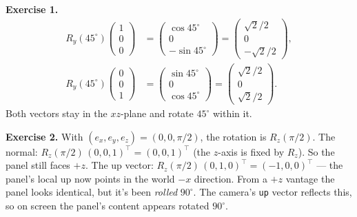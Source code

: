 \documentclass{article}
\begin{document}
\textbf{Exercise 1.}
\begin{align*}
R_y(45^\circ)\begin{pmatrix}1\\0\\0\end{pmatrix} &= \begin{pmatrix}\cos 45^\circ\\ 0\\ -\sin 45^\circ\end{pmatrix} = \begin{pmatrix}\sqrt{2}/2\\ 0\\ -\sqrt{2}/2\end{pmatrix},\\
R_y(45^\circ)\begin{pmatrix}0\\0\\1\end{pmatrix} &= \begin{pmatrix}\sin 45^\circ\\ 0\\ \cos 45^\circ\end{pmatrix} = \begin{pmatrix}\sqrt{2}/2\\ 0\\ \sqrt{2}/2\end{pmatrix}.
\end{align*}
Both vectors stay in the $xz$-plane and rotate $45^\circ$ within it.

\textbf{Exercise 2.} With $(e_x, e_y, e_z) = (0, 0, \pi/2)$, the rotation is
$R_z(\pi/2)$. The normal: $R_z(\pi/2)\,(0,0,1)^\top = (0,0,1)^\top$ (the
$z$-axis is fixed by $R_z$). So the panel still faces $+z$. The up vector:
$R_z(\pi/2)\,(0,1,0)^\top = (-1, 0, 0)^\top$ --- the panel's local up now
points in the world $-x$ direction. From a $+z$ vantage the panel looks
identical, but it's been \emph{rolled} $90^\circ$. The camera's
\lstinline|up| vector reflects this, so on screen the panel's content
appears rotated $90^\circ$.
\end{document}
